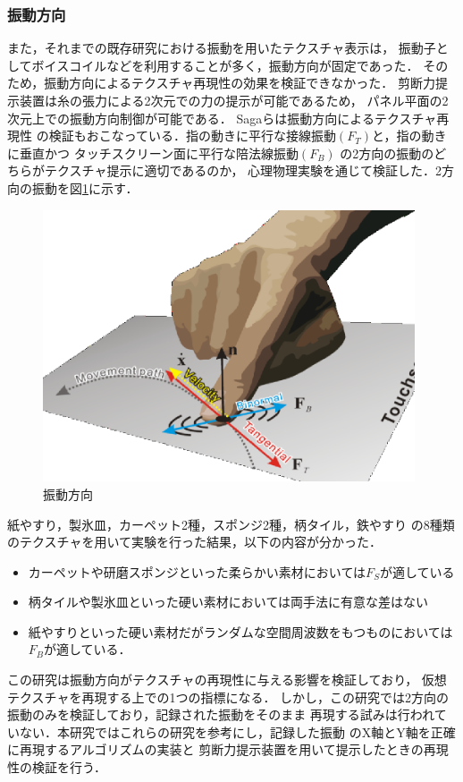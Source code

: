 \subsubsection*{振動方向}

また，それまでの既存研究における振動を用いたテクスチャ表示は，
振動子としてボイスコイルなどを利用することが多く，振動方向が固定であった．
そのため，振動方向によるテクスチャ再現性の効果を検証できなかった．
剪断力提示装置は糸の張力による2次元での力の提示が可能であるため，
パネル平面の2次元上での振動方向制御が可能である．
Sagaら\cite{saga2013simultaneous}は振動方向によるテクスチャ再現性
の検証もおこなっている．指の動きに平行な接線振動$(F_T)$と，指の動きに垂直かつ
タッチスクリーン面に平行な陪法線振動$(F_B)$
の2方向の振動のどちらがテクスチャ提示に適切であるのか，
心理物理実験を通じて検証した．2方向の振動を図\ref{3-2}に示す．


\begin{figure}[t]
\begin{center}
  \includegraphics[width=11.0cm]{sinndou.eps}
  \caption{振動方向}
  \label{3-2}
\end{center}
\end{figure}

紙やすり，製氷皿，カーペット2種，スポンジ2種，柄タイル，鉄やすり
の8種類のテクスチャを用いて実験を行った結果，以下の内容が分かった．
\begin{itemize}
  \item カーペットや研磨スポンジといった柔らかい素材においては$F_S$が適している
  \item 柄タイルや製氷皿といった硬い素材においては両手法に有意な差はない
  \item 紙やすりといった硬い素材だがランダムな空間周波数をもつものにおいては
  $F_B$が適している．
\end{itemize}
この研究は振動方向がテクスチャの再現性に与える影響を検証しており，
仮想テクスチャを再現する上での1つの指標になる．
しかし，この研究では2方向の振動のみを検証しており，記録された振動をそのまま
再現する試みは行われていない．本研究ではこれらの研究を参考にし，記録した振動
のX軸とY軸を正確に再現するアルゴリズムの実装と
剪断力提示装置を用いて提示したときの再現性の検証を行う．



